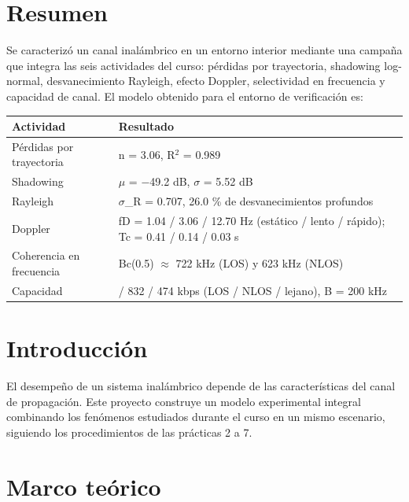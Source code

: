 \documentclass[11pt,a4paper]{article}
\begin{document}
\section{Resumen}

Se caracterizó un canal inalámbrico en un entorno interior mediante una campaña que integra las seis actividades del curso: pérdidas por trayectoria, shadowing log-normal, desvanecimiento Rayleigh, efecto Doppler, selectividad en frecuencia y capacidad de canal. El modelo obtenido para el entorno de verificación es:

\begin{tabularx}{\linewidth}{@{}*{2}{>{\raggedright\arraybackslash}X}@{}}
\toprule
Actividad & Resultado \\
\midrule
Pérdidas por trayectoria & n = 3.06, R$^2$ = 0.989 \\
Shadowing & $\mu$ = $-$49.2 dB, $\sigma$ = 5.52 dB \\
Rayleigh & $\sigma$\_R = 0.707, 26.0 \% de desvanecimientos profundos \\
Doppler & fD = 1.04 / 3.06 / 12.70 Hz (estático / lento / rápido); Tc = 0.41 / 0.14 / 0.03 s \\
Coherencia en frecuencia & Bc(0.5) $\approx$ 722 kHz (LOS) y 623 kHz (NLOS) \\
Capacidad & 1335 / 832 / 474 kbps (LOS / NLOS / lejano), B = 200 kHz \\
\bottomrule
\end{tabularx}

\section{Introducción}

El desempeño de un sistema inalámbrico depende de las características del canal de propagación. Este proyecto construye un modelo experimental integral combinando los fenómenos estudiados durante el curso en un mismo escenario, siguiendo los procedimientos de las prácticas 2 a 7.

\section{Marco teórico}
\end{document}
